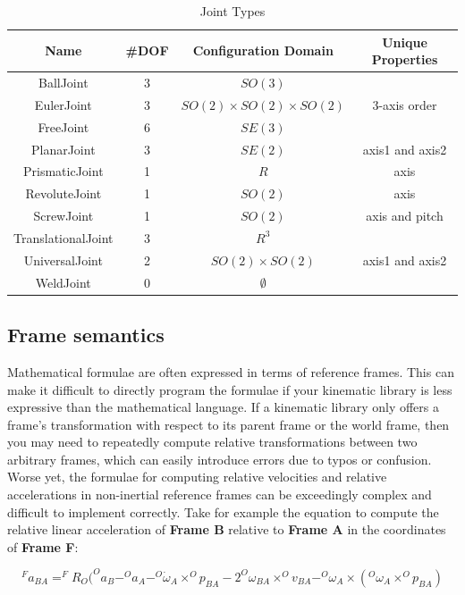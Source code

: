 \begin{table}[h]
\centering
\caption{Joint Types}
\begin{tabular}{|c|c|c|c|}
  \hline
  \textbf{Name} & \textbf{\#DOF} & \textbf{Configuration Domain}  & \textbf{Unique Properties}\\
  \hline
  BallJoint  &  3 & $SO(3)$  & \\
  \hline
  EulerJoint & 3  & $SO(2) \times SO(2) \times SO(2)$ & 3-axis order \\
  \hline
  FreeJoint  & 6 & $SE(3)$  &\\
  \hline
  PlanarJoint & 3  & $SE(2)$ & axis1 and axis2 \\
  \hline
  PrismaticJoint & 1  & $R$ & axis \\
  \hline
  RevoluteJoint & 1  & $SO(2)$ & axis \\
  \hline
  ScrewJoint & 1  & $SO(2)$ & axis and pitch \\
  \hline
  TranslationalJoint & 3  & $R^3$ &  \\
  \hline
  UniversalJoint & 2  & $SO(2) \times SO(2)$ & axis1 and axis2 \\
  \hline
  WeldJoint & 0  & $\emptyset$ &  \\
  \hline
\end{tabular}
\label{tab:jointTypes}
\end{table}

\subsection{Frame semantics}
\label{sec:FrameSemantics}
Mathematical formulae are often expressed in terms of reference frames. This can make it difficult to directly program the formulae if your kinematic library is less expressive than the mathematical language. If a kinematic library only offers a frame's transformation with respect to its parent frame or the world frame, then you may need to repeatedly compute relative transformations between two arbitrary frames, which can easily introduce errors due to typos or confusion. Worse yet, the formulae for computing relative velocities and relative accelerations in non-inertial reference frames can be exceedingly complex and difficult to implement correctly. Take for example the equation to compute the relative linear acceleration of \textbf{Frame B} relative to \textbf{Frame A} in the coordinates of \textbf{Frame F}:

\begin{equation}
\label{eqn:rel_accel}
^{F}a_{BA} = ^{F}R_{O} ( ^{O}a_{B} - ^{O}a_{A} - ^{O}\dot{\omega}_{A} \times ^{O}p_{BA} - 2 ^{O}\omega_{BA} \times ^{O}v_{BA} - ^{O}\omega_A \times (^{O}\omega_{A} \times ^{O}p_{BA})
\end{equation}

